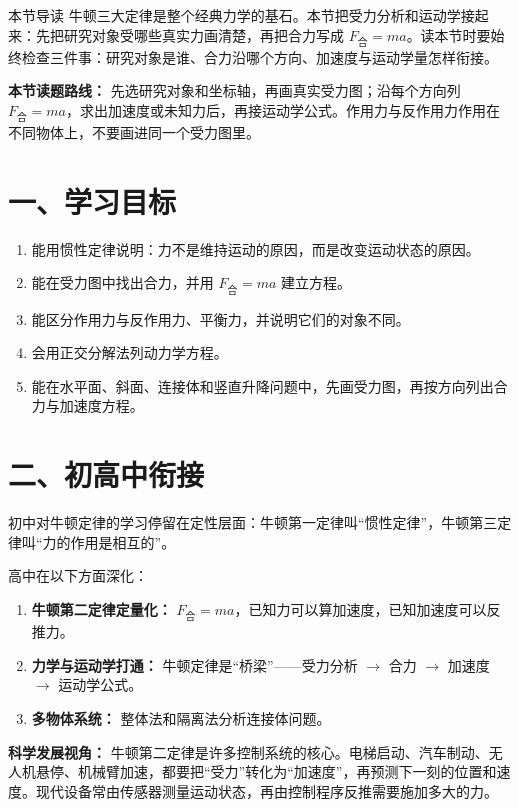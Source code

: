 
\begin{learningbox}{本节导读}
牛顿三大定律是整个经典力学的基石。本节把受力分析和运动学接起来：先把研究对象受哪些真实力画清楚，再把合力写成 $F_{\text{合}} = ma$。读本节时要始终检查三件事：研究对象是谁、合力沿哪个方向、加速度与运动学量怎样衔接。
\end{learningbox}

\textbf{本节读题路线：} 先选研究对象和坐标轴，再画真实受力图；沿每个方向列 $F_{\text{合}}=ma$，求出加速度或未知力后，再接运动学公式。作用力与反作用力作用在不同物体上，不要画进同一个受力图里。

\section*{一、学习目标}

\begin{enumerate}
  \item 能用惯性定律说明：力不是维持运动的原因，而是改变运动状态的原因。
  \item 能在受力图中找出合力，并用 $F_{\text{合}} = ma$ 建立方程。
  \item 能区分作用力与反作用力、平衡力，并说明它们的对象不同。
  \item 会用正交分解法列动力学方程。
  \item 能在水平面、斜面、连接体和竖直升降问题中，先画受力图，再按方向列出合力与加速度方程。
\end{enumerate}

\section*{二、初高中衔接}

初中对牛顿定律的学习停留在定性层面：牛顿第一定律叫“惯性定律”，牛顿第三定律叫“力的作用是相互的”。

高中在以下方面深化：
\begin{enumerate}
  \item \textbf{牛顿第二定律定量化：} $F_{\text{合}} = ma$，已知力可以算加速度，已知加速度可以反推力。
  \item \textbf{力学与运动学打通：} 牛顿定律是“桥梁”——受力分析 $\to$ 合力 $\to$ 加速度 $\to$ 运动学公式。
  \item \textbf{多物体系统：} 整体法和隔离法分析连接体问题。
\end{enumerate}

\textbf{科学发展视角：} 牛顿第二定律是许多控制系统的核心。电梯启动、汽车制动、无人机悬停、机械臂加速，都要把“受力”转化为“加速度”，再预测下一刻的位置和速度。现代设备常由传感器测量运动状态，再由控制程序反推需要施加多大的力。

